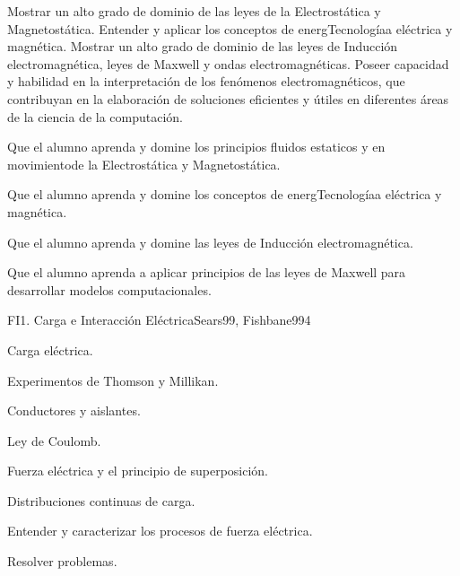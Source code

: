 \begin{syllabus}


\begin{justification}
Mostrar un alto grado de dominio de las leyes de la Electrostática y Magnetostática. Entender y aplicar los conceptos de energTecnologíaa eléctrica y magnética. Mostrar un alto grado de dominio de las leyes de Inducción electromagnética, leyes de Maxwell y ondas electromagnéticas. Poseer capacidad y habilidad en la interpretación de los fenómenos electromagnéticos, que contribuyan en la elaboración de soluciones eficientes y útiles en diferentes áreas de la ciencia de la computación. 
\end{justification}

\begin{goals}
\item  Que el alumno aprenda y domine los principios fluidos estaticos y en movimientode la Electrostática y Magnetostática.
\item  Que el alumno aprenda y domine los conceptos de energTecnologíaa eléctrica y magnética.
\item  Que el alumno aprenda y domine las leyes de Inducción electromagnética.
\item  Que el alumno aprenda a aplicar principios de las leyes de Maxwell para desarrollar modelos computacionales.
\end{goals}

\begin{outcomes}
\end{outcomes}

\begin{unit}{FI1. Carga e Interacción Eléctrica}{Sears99, Fishbane99}{4}
   \begin{topics}
         \item  Carga eléctrica.
	 \item  Experimentos de Thomson y Millikan.
         \item  Conductores y aislantes.
	 \item  Ley de Coulomb.
         \item  Fuerza eléctrica y el principio de superposición.
         \item  Distribuciones continuas de carga.
   \end{topics}

   \begin{unitgoals}
         \item  Entender y caracterizar los procesos de fuerza eléctrica.
         \item  Resolver problemas.
   \end{unitgoals}
\end{unit}


\end{syllabus}

